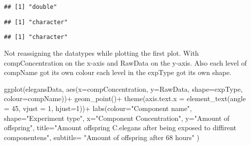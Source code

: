 \documentclass[
]{book}
\newenvironment{Shaded}{\begin{snugshade}}{\end{snugshade}}
\newcommand{\AttributeTok}[1]{\textcolor[rgb]{0.77,0.63,0.00}{#1}}
\newcommand{\DecValTok}[1]{\textcolor[rgb]{0.00,0.00,0.81}{#1}}
\newcommand{\FunctionTok}[1]{\textcolor[rgb]{0.00,0.00,0.00}{#1}}
\newcommand{\NormalTok}[1]{#1}
\newcommand{\SpecialCharTok}[1]{\textcolor[rgb]{0.00,0.00,0.00}{#1}}
\newcommand{\StringTok}[1]{\textcolor[rgb]{0.31,0.60,0.02}{#1}}
\begin{document}
\begin{verbatim}
## [1] "double"
\end{verbatim}

\begin{Shaded}
\end{Shaded}

\begin{verbatim}
## [1] "character"
\end{verbatim}

\begin{Shaded}
\end{Shaded}

\begin{verbatim}
## [1] "character"
\end{verbatim}

Not reassigning the datatypes while plotting the first plot. With compConcentration on the x-axis and RawData on the y-axis. Also each level of compName got its own colour each level in the expType got its own shape.

\begin{Shaded}
\begin{Highlighting}[]
  \FunctionTok{ggplot}\NormalTok{(elegansData, }\FunctionTok{aes}\NormalTok{(}\AttributeTok{x=}\NormalTok{compConcentration, }\AttributeTok{y=}\NormalTok{RawData, }\AttributeTok{shape=}\NormalTok{expType, }\AttributeTok{colour=}\NormalTok{compName))}\SpecialCharTok{+}
  \FunctionTok{geom\_point}\NormalTok{()}\SpecialCharTok{+}
  \FunctionTok{theme}\NormalTok{(}\AttributeTok{axis.text.x =} \FunctionTok{element\_text}\NormalTok{(}\AttributeTok{angle =} \DecValTok{45}\NormalTok{, }\AttributeTok{vjust =} \DecValTok{1}\NormalTok{, }\AttributeTok{hjust=}\DecValTok{1}\NormalTok{))}\SpecialCharTok{+}
  \FunctionTok{labs}\NormalTok{(}\AttributeTok{colour=}\StringTok{"Component name"}\NormalTok{, }\AttributeTok{shape=}\StringTok{"Experiment type"}\NormalTok{,}
       \AttributeTok{x=}\StringTok{"Component Concentration"}\NormalTok{,}
       \AttributeTok{y=}\StringTok{"Amount of offspring"}\NormalTok{,}
       \AttributeTok{title=}\StringTok{"Amount offspring C.elegans after being exposed to diffirent componentens"}\NormalTok{,}
       \AttributeTok{subtitle=} \StringTok{"Amount of offspring after 68 hours"}
\NormalTok{)}
\end{Highlighting}
\end{Shaded}
\end{document}
